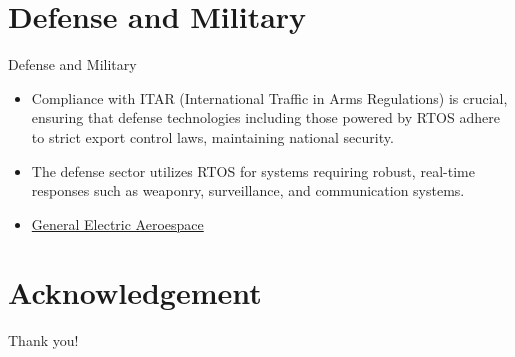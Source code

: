 \documentclass[10pt]{beamer}
\begin{document}
\section{Defense and Military}
\begin{frame}{Defense and Military}
    \begin{itemize}
        \item Compliance with ITAR (International Traffic in Arms Regulations) is crucial, ensuring that defense technologies including those powered by RTOS adhere to strict export control laws, maintaining national security.
        \item The defense sector utilizes RTOS for systems requiring robust, real-time responses such as weaponry, surveillance, and communication systems.
        \item \href{https://www.geaerospace.com/military-defense/engines/xa100}{General Electric Aeroespace}
    \end{itemize}
\end{frame}

\section*{Acknowledgement}  
\begin{frame}
\textcolor{myNewColorA}{\Huge{\centerline{Thank you!}}}
\end{frame}
\end{document}

